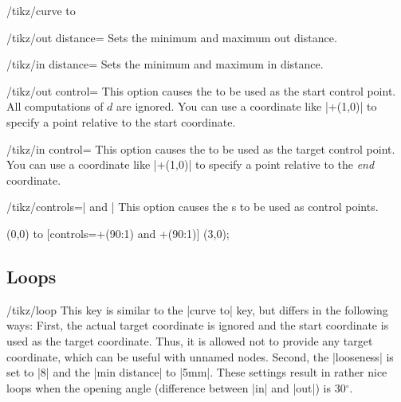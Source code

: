 \begin{key}{/tikz/curve to}
    \begin{key}{/tikz/out distance=}
        Sets the minimum and maximum out distance.
    \end{key}
    \begin{key}{/tikz/in distance=}
        Sets the minimum and maximum in distance.
    \end{key}
    \begin{key}{/tikz/out control=}
        This option causes the  to be used as the start
        control point. All computations of $d$ are ignored. You can use a
        coordinate like |+(1,0)| to specify a point relative to the start
        coordinate.
    \end{key}
    \begin{key}{/tikz/in control=}
        This option causes the  to be used as the target
        control point. You can use a coordinate like |+(1,0)| to specify
        a point relative to the \emph{end} coordinate.
    \end{key}
    \begin{key}{/tikz/controls=| and |}
        This option causes the s to be used as control points.
\begin{codeexample}[]
\tikz \draw (0,0) to [controls=+(90:1) and +(90:1)] (3,0);
\end{codeexample}
    \end{key}
\end{key}


\subsection{Loops}

\begin{key}{/tikz/loop}
    This key is similar to the |curve to| key, but differs in the following
    ways: First, the actual target coordinate is ignored and the start
    coordinate is used as the target coordinate. Thus, it is allowed not to
    provide any target coordinate, which can be useful with unnamed nodes.
    Second, the |looseness| is set to |8| and the |min distance| to |5mm|.
    These settings result in rather nice loops when the opening angle
    (difference between |in| and |out|) is 30$^\circ$.
\begin{codeexample}[]
\end{codeexample}
\end{key}

